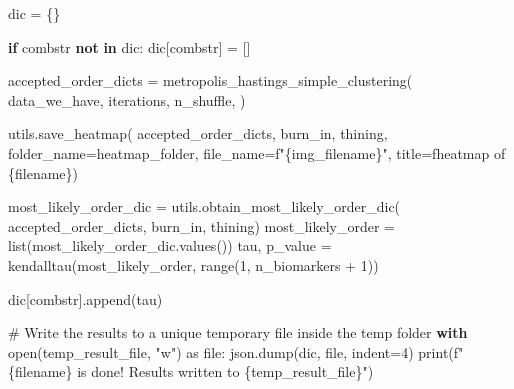 \documentclass[
  letterpaper,
  DIV=11,
  numbers=noendperiod]{scrreprt}
\newenvironment{Shaded}{\begin{snugshade}}{\end{snugshade}}
\newcommand{\BuiltInTok}[1]{\textcolor[rgb]{0.00,0.23,0.31}{#1}}
\newcommand{\CommentTok}[1]{\textcolor[rgb]{0.37,0.37,0.37}{#1}}
\newcommand{\ControlFlowTok}[1]{\textcolor[rgb]{0.00,0.23,0.31}{\textbf{#1}}}
\newcommand{\DecValTok}[1]{\textcolor[rgb]{0.68,0.00,0.00}{#1}}
\newcommand{\ImportTok}[1]{\textcolor[rgb]{0.00,0.46,0.62}{#1}}
\newcommand{\KeywordTok}[1]{\textcolor[rgb]{0.00,0.23,0.31}{\textbf{#1}}}
\newcommand{\NormalTok}[1]{\textcolor[rgb]{0.00,0.23,0.31}{#1}}
\newcommand{\OperatorTok}[1]{\textcolor[rgb]{0.37,0.37,0.37}{#1}}
\newcommand{\SpecialCharTok}[1]{\textcolor[rgb]{0.37,0.37,0.37}{#1}}
\newcommand{\SpecialStringTok}[1]{\textcolor[rgb]{0.13,0.47,0.30}{#1}}
\newcommand{\StringTok}[1]{\textcolor[rgb]{0.13,0.47,0.30}{#1}}
\begin{document}
\begin{Shaded}
\begin{Highlighting}[]
\NormalTok{    dic }\OperatorTok{=}\NormalTok{ \{\}}

    \ControlFlowTok{if}\NormalTok{ combstr }\KeywordTok{not} \KeywordTok{in}\NormalTok{ dic:}
\NormalTok{        dic[combstr] }\OperatorTok{=}\NormalTok{ []}

\NormalTok{    accepted\_order\_dicts }\OperatorTok{=}\NormalTok{ metropolis\_hastings\_simple\_clustering(}
\NormalTok{        data\_we\_have,}
\NormalTok{        iterations,}
\NormalTok{        n\_shuffle,}
\NormalTok{    )}

\NormalTok{    utils.save\_heatmap(}
\NormalTok{        accepted\_order\_dicts,}
\NormalTok{        burn\_in, }
\NormalTok{        thining, }
\NormalTok{        folder\_name}\OperatorTok{=}\NormalTok{heatmap\_folder,}
\NormalTok{        file\_name}\OperatorTok{=}\SpecialStringTok{f"}\SpecialCharTok{\{}\NormalTok{img\_filename}\SpecialCharTok{\}}\SpecialStringTok{"}\NormalTok{, }
\NormalTok{        title}\OperatorTok{=}\SpecialStringTok{f\textquotesingle{}heatmap of }\SpecialCharTok{\{}\NormalTok{filename}\SpecialCharTok{\}}\SpecialStringTok{\textquotesingle{}}\NormalTok{)}
    
\NormalTok{    most\_likely\_order\_dic }\OperatorTok{=}\NormalTok{ utils.obtain\_most\_likely\_order\_dic(}
\NormalTok{        accepted\_order\_dicts, burn\_in, thining)}
\NormalTok{    most\_likely\_order }\OperatorTok{=} \BuiltInTok{list}\NormalTok{(most\_likely\_order\_dic.values())}
\NormalTok{    tau, p\_value }\OperatorTok{=}\NormalTok{ kendalltau(most\_likely\_order, }\BuiltInTok{range}\NormalTok{(}\DecValTok{1}\NormalTok{, n\_biomarkers }\OperatorTok{+} \DecValTok{1}\NormalTok{))}
    
\NormalTok{    dic[combstr].append(tau)}
    
    \CommentTok{\# Write the results to a unique temporary file inside the temp folder}
    \ControlFlowTok{with} \BuiltInTok{open}\NormalTok{(temp\_result\_file, }\StringTok{"w"}\NormalTok{) }\ImportTok{as} \BuiltInTok{file}\NormalTok{:}
\NormalTok{        json.dump(dic, }\BuiltInTok{file}\NormalTok{, indent}\OperatorTok{=}\DecValTok{4}\NormalTok{)}
    \BuiltInTok{print}\NormalTok{(}\SpecialStringTok{f"}\SpecialCharTok{\{}\NormalTok{filename}\SpecialCharTok{\}}\SpecialStringTok{ is done! Results written to }\SpecialCharTok{\{}\NormalTok{temp\_result\_file}\SpecialCharTok{\}}\SpecialStringTok{"}\NormalTok{)}
\end{Highlighting}
\end{Shaded}
\end{document}
